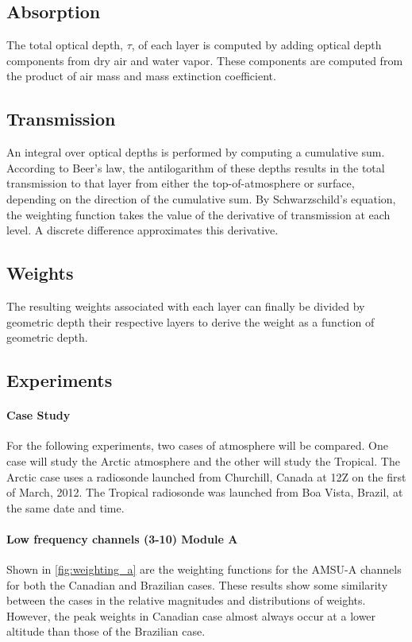 \documentclass[twocol]{ametsoc}
\begin{document}
\subsection{Absorption}

The total optical depth, $\tau$, of each layer is computed by adding optical depth components from dry air and water vapor.
These components are computed from the product of air mass and mass extinction coefficient.

\subsection{Transmission}

An integral over optical depths is performed by computing a cumulative sum.
According to Beer's law, the antilogarithm of these depths results in the total transmission to that layer from either the top-of-atmosphere or surface, depending on the direction of the cumulative sum.
By Schwarzschild's equation, the weighting function takes the value of the derivative of transmission at each level.
A discrete difference approximates this derivative.

\subsection{Weights}

The resulting weights associated with each layer can finally be divided by geometric depth their respective layers to derive the weight as a function of geometric depth.

\subsection{Experiments}

\paragraph*{Case Study} For the following experiments, two cases of atmosphere will be compared.
One case will study the Arctic atmosphere and the other will study the Tropical.
The Arctic case uses a radiosonde launched from Churchill, Canada at 12Z on the first of March, 2012.
The Tropical radiosonde was launched from Boa Vista, Brazil, at the same date and time.

\paragraph{Low frequency channels (3-10) Module A }
Shown in \autoref{fig:weighting_a} are the weighting functions for the AMSU-A channels for both the Canadian and Brazilian cases.
These results show some similarity between the cases in the relative magnitudes and distributions of weights.
However, the peak weights in Canadian case almost always occur at a lower altitude than those of the Brazilian case.
 
\end{document}
